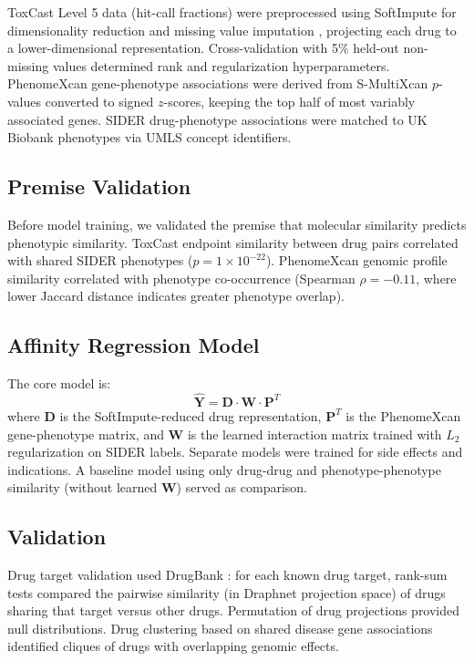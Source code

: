 \documentclass[12pt]{article}
\begin{document}
ToxCast Level 5 data (hit-call fractions) were preprocessed using SoftImpute for dimensionality reduction and missing value imputation \citep{mazumder2010softimpute}, projecting each drug to a lower-dimensional representation. Cross-validation with 5\% held-out non-missing values determined rank and regularization hyperparameters. PhenomeXcan gene-phenotype associations were derived from S-MultiXcan $p$-values converted to signed $z$-scores, keeping the top half of most variably associated genes. SIDER drug-phenotype associations were matched to UK Biobank phenotypes via UMLS concept identifiers.

\subsection{Premise Validation}

Before model training, we validated the premise that molecular similarity predicts phenotypic similarity. ToxCast endpoint similarity between drug pairs correlated with shared SIDER phenotypes ($p = 1 \times 10^{-22}$). PhenomeXcan genomic profile similarity correlated with phenotype co-occurrence (Spearman $\rho = -0.11$, where lower Jaccard distance indicates greater phenotype overlap).

\subsection{Affinity Regression Model}

The core model is:
\begin{equation}
\hat{\mathbf{Y}} = \mathbf{D} \cdot \mathbf{W} \cdot \mathbf{P}^T
\end{equation}
where $\mathbf{D}$ is the SoftImpute-reduced drug representation, $\mathbf{P}^T$ is the PhenomeXcan gene-phenotype matrix, and $\mathbf{W}$ is the learned interaction matrix trained with $L_2$ regularization on SIDER labels. Separate models were trained for side effects and indications. A baseline model using only drug-drug and phenotype-phenotype similarity (without learned $\mathbf{W}$) served as comparison.

\subsection{Validation}

Drug target validation used DrugBank \citep{wishart2018drugbank}: for each known drug target, rank-sum tests compared the pairwise similarity (in Draphnet projection space) of drugs sharing that target versus other drugs. Permutation of drug projections provided null distributions. Drug clustering based on shared disease gene associations identified cliques of drugs with overlapping genomic effects.
\end{document}
